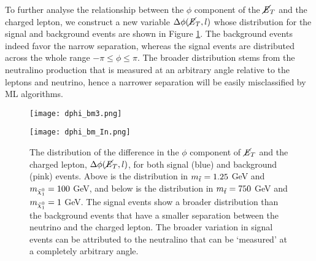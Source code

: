 \newpage

To further analyse the relationship between the $\phi$ component of the $\cancel{\it{E}}_{T}$ and the charged lepton, we construct a new variable $\Delta \phi(\cancel{\it{E}}_{T},l)$ whose distribution for the signal and background events are shown in Figure \ref{fig:dphi}. The background events indeed favor the narrow separation, whereas the signal events are distributed across the whole range $-\pi \leq \phi \leq \pi$. The broader distribution stems from the neutralino production that is measured at an arbitrary angle relative to the leptons and neutrino, hence a narrower separation will be easily misclassified by ML algorithms. \\

\begin{figure}[htbp]
\centering
  \begin{minipage}[htbp]{\textwidth}
    \centering
    \texttt{[image: dphi\_bm3.png]}
  \end{minipage}
  \begin{minipage}[htbp]{\textwidth}
    \centering
    \texttt{[image: dphi\_bm\_In.png]}
  \end{minipage}
  \caption{The distribution of the difference in the $\phi$ component of $\cancel{\it{E}}_{T}$ and the charged lepton, $\Delta \phi(\cancel{\it{E}}_{T},l)$, for both signal (blue) and background (pink) events. Above is the distribution in $m_{\Tilde{t}} = 1.25$ GeV and $m_{\Tilde{\chi}_1^0} = 100$ GeV, and below is the distribution in $m_{\Tilde{t}} = 750$ GeV and $m_{\Tilde{\chi}_1^0} = 1$ GeV. The signal events show a broader distribution than the background events that have a smaller separation between the neutrino and the charged lepton. The broader variation in signal events can be attributed to the neutralino that can be `measured' at a completely arbitrary angle.}
  \label{fig:dphi}
\end{figure}

